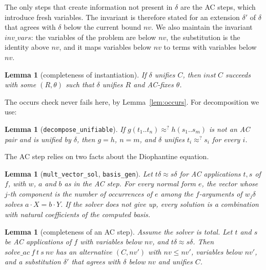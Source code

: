 \documentclass[11pt,a4paper]{article}
\newtheorem{lemma}[theorem]{Lemma}
\theoremstyle{definition}
\theoremstyle{remark}
\newcommand{\isa}[1]{\mbox{\small\texttt{#1}}}
\newcommand{\eqAC}{\approx}
\begin{document}
The only steps that create information not present in $\delta$ are the AC steps, which introduce
fresh variables. The invariant is therefore stated for an extension $\delta'$ of $\delta$ that
agrees with $\delta$ below the current bound $\mathit{nv}$. We also maintain the invariant
$\mathit{inv\_vars}$: the variables of the problem are below $\mathit{nv}$, the substitution is
the identity above $\mathit{nv}$, and it maps variables below $\mathit{nv}$ to terms with
variables below $\mathit{nv}$.

\begin{lemma}[completeness of instantiation]\label{lem:inst-complete}
  If $\delta$ unifies $C$, then $\mathit{inst}\ C$ succeeds with some $(R, \theta)$ such that
  $\delta$ unifies $R$ and AC-fixes $\theta$.
\end{lemma}

The occurs check never fails here, by Lemma~\ref{lem:occurs}. For decomposition we use:

\begin{lemma}[\isa{decompose\_unifiable}]
  If $g(t_1..t_n) \approx^? h(s_1..s_m)$ is not an AC pair and is unified by $\delta$, then
  $g = h$, $n = m$, and $\delta$ unifies $t_i \approx^? s_i$ for every $i$.
\end{lemma}

The AC step relies on two facts about the Diophantine equation.

\begin{lemma}[\isa{mult\_vector\_sol}, \isa{basis\_gen}]
  Let $t\delta \eqAC s\delta$ for AC applications $t, s$ of $f$, with $w$, $a$ and $b$ as in the
  AC step. For every normal form $e$, the vector whose $j$-th component is the number of
  occurrences of $e$ among the $f$-arguments of $w_j\delta$ solves $a \cdot X = b \cdot Y$. If
  the solver does not give up, every solution is a combination with natural coefficients of the
  computed basis.
\end{lemma}

\begin{lemma}[completeness of an AC step]\label{lem:solve-complete}
  Assume the solver is total. Let $t$ and $s$ be AC applications of $f$ with variables below
  $\mathit{nv}$, and $t\delta \eqAC s\delta$. Then $\mathit{solve\_ac}\ f\ t\ s\ \mathit{nv}$ has an
  alternative $(C, \mathit{nv}')$ with $\mathit{nv} \le \mathit{nv}'$, variables below
  $\mathit{nv}'$, and a substitution $\delta'$ that agrees with $\delta$ below $\mathit{nv}$ and
  unifies $C$.
\end{lemma}
\end{document}
